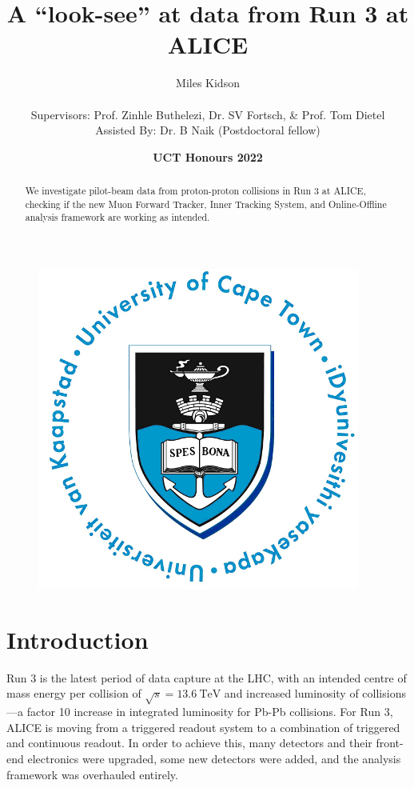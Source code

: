 \documentclass[11pt]{article}
\title{{\Huge A ``look-see'' at data from Run 3 at ALICE}}
\author{{\Large Miles Kidson}\\ \\
Supervisors: Prof. Zinhle Buthelezi, Dr. SV Fortsch, \& Prof. Tom Dietel\\
Assisted By: Dr. B Naik (Postdoctoral fellow)}
\date{\textbf{UCT Honours 2022}}
\numberwithin{equation}{section}
\numberwithin{figure}{section}
\numberwithin{table}{section}
\begin{document}
    
\maketitle

\begin{figure}[h]
    \begin{center}
        \includegraphics{Figs/UCT.jpg}
    \end{center}
\end{figure}

\begin{abstract}
    \centering
    We investigate pilot-beam data from proton-proton collisions in Run 3 at ALICE, checking if the new Muon Forward Tracker, Inner Tracking System, and Online-Offline analysis framework are working as intended. 
\end{abstract}

\newpage
\tableofcontents

\newpage
\section{Introduction}\label{sec:Introduction}
Run 3 is the latest period of data capture at the LHC, with an intended centre of mass energy per collision of $\sqrt{s}=\SI{13.6}{\tera\electronvolt}$ and increased luminosity of collisions---a factor 10 increase in integrated luminosity for Pb-Pb collisions. For Run 3, ALICE is moving from a triggered readout system to a combination of triggered and continuous readout. In order to achieve this, many detectors and their front-end electronics were upgraded, some new detectors were added, and the analysis framework was overhauled entirely. 
\end{document}
